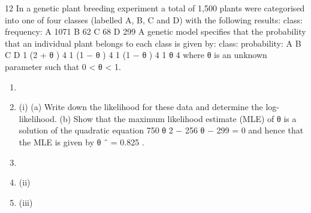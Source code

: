 \documentclass[a4paper,12pt]{article}
\begin{document}
\begin{enumerate}

12
In a genetic plant breeding experiment a total of 1,500 plants were categorised into one of four classes (labelled A, B, C and D) with the following results:
class:
frequency:
A
1071
B
62
C
68
D
299
A genetic model specifies that the probability that an individual plant belongs to each
class is given by:
class:
probability:
A B C D
1
(2 + θ )
4 1
(1 − θ )
4 1
(1 − θ )
4 1
θ
4
where θ is an unknown parameter such that 0 < θ < 1.
\begin{enumerate}
\item \item (i)
(a) Write down the likelihood for these data and determine the log-likelihood.
(b) Show that the maximum likelihood estimate (MLE) of θ is a solution of the quadratic equation
750 θ 2 − 256 θ − 299 = 0
and hence that the MLE is given by θ ˆ = 0.825 .
\item \item (ii)
\item (iii)


\end{enumerate}
\end{enumerate}
\end{document}
